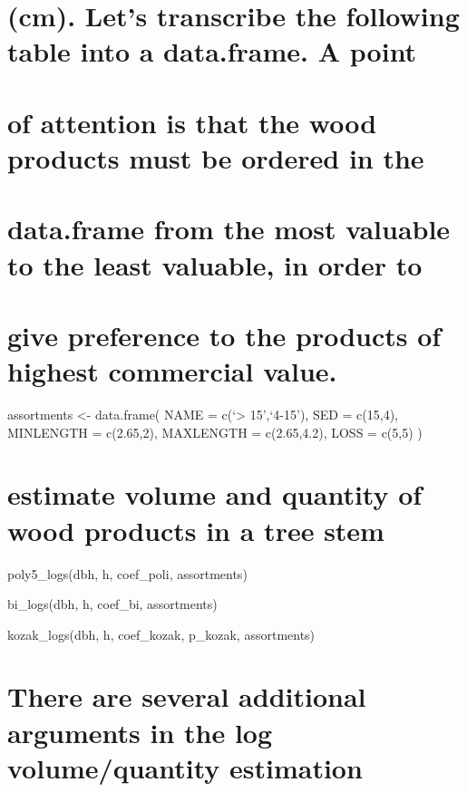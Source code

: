\documentclass[
]{article}
\begin{document}
\hypertarget{cm.-lets-transcribe-the-following-table-into-a-data.frame.-a-point}{%
\section{(cm). Let's transcribe the following table into a data.frame. A
point}\label{cm.-lets-transcribe-the-following-table-into-a-data.frame.-a-point}}

\hypertarget{of-attention-is-that-the-wood-products-must-be-ordered-in-the}{%
\section{of attention is that the wood products must be ordered in
the}\label{of-attention-is-that-the-wood-products-must-be-ordered-in-the}}

\hypertarget{data.frame-from-the-most-valuable-to-the-least-valuable-in-order-to}{%
\section{data.frame from the most valuable to the least valuable, in
order
to}\label{data.frame-from-the-most-valuable-to-the-least-valuable-in-order-to}}

\hypertarget{give-preference-to-the-products-of-highest-commercial-value.}{%
\section{give preference to the products of highest commercial
value.}\label{give-preference-to-the-products-of-highest-commercial-value.}}

assortments \textless- data.frame( NAME = c(`\textgreater{} 15',`4-15'),
SED = c(15,4), MINLENGTH = c(2.65,2), MAXLENGTH = c(2.65,4.2), LOSS =
c(5,5) )

\hypertarget{estimate-volume-and-quantity-of-wood-products-in-a-tree-stem}{%
\section{estimate volume and quantity of wood products in a tree
stem}\label{estimate-volume-and-quantity-of-wood-products-in-a-tree-stem}}

poly5\_logs(dbh, h, coef\_poli, assortments)

bi\_logs(dbh, h, coef\_bi, assortments)

kozak\_logs(dbh, h, coef\_kozak, p\_kozak, assortments)

\hypertarget{there-are-several-additional-arguments-in-the-log-volumequantity-estimation}{%
\section{There are several additional arguments in the log
volume/quantity
estimation}\label{there-are-several-additional-arguments-in-the-log-volumequantity-estimation}}
\end{document}
